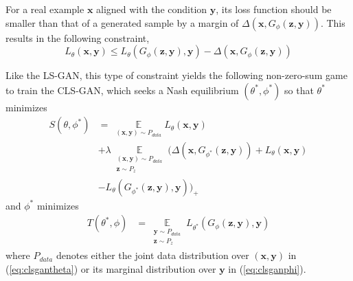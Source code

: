 For a real example $\mathbf x$ aligned with the condition $\mathbf y$, its loss function should be smaller than that of a generated sample by a margin of $\Delta(\mathbf x, G_\phi(\mathbf z,\mathbf y))$.  This results in the following constraint,
\begin{equation}
L_\theta(\mathbf x, \mathbf y) \leq L_\theta(G_\phi(\mathbf z,\mathbf y),\mathbf y) - \Delta(\mathbf x, G_\phi(\mathbf z,\mathbf y))
\end{equation}




Like the LS-GAN, this type of constraint yields the following non-zero-sum game to train the CLS-GAN, which seeks a Nash equilibrium $(\theta^*,\phi^*)$ so that
$\theta^*$ minimizes
\begin{align}\label{eq:clsgantheta}
S(\theta,\phi^*)&= ~\mathop \mathbb E\limits_{(\mathbf x,\mathbf y)\sim P_{data}} L_\theta(\mathbf x, \mathbf y) \\\nonumber
&+ \lambda \mathop \mathbb E\limits_{\substack{(\mathbf x,\mathbf y)\sim P_{data} \\\nonumber
\mathbf z\sim P_z}}\big( \Delta(\mathbf x, G_{\phi^*}(\mathbf z,\mathbf y)) + L_\theta(\mathbf x,\mathbf y) \\\nonumber
&- L_\theta(G_{\phi^*}(\mathbf z,\mathbf y),\mathbf y) \big)_+
\end{align}
and $\phi^*$ minimizes
\begin{align}\label{eq:clsganphi}
T(\theta^*,\phi)&=  \mathop \mathbb E\limits_{\substack{\mathbf y\sim P_{data} \\
\mathbf z\sim P_z}} L_{\theta^*}(G_\phi(\mathbf z,\mathbf y),\mathbf y)
\end{align}
where $P_{data}$ denotes either the joint data distribution over $(\mathbf x, \mathbf y)$ in (\ref{eq:clsgantheta}) or its marginal distribution over $\mathbf y$ in (\ref{eq:clsganphi}).

